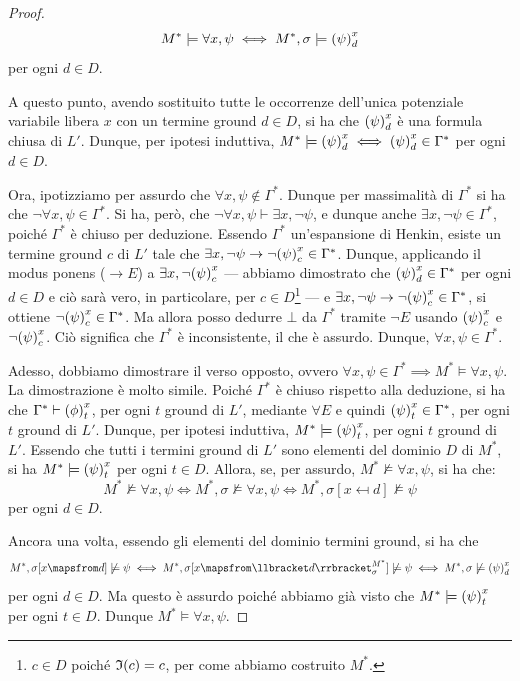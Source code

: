 \begin{proof}
  \[M^* \models \forall x, \psi \iff M^*,\sigma \models {{\left(\psi\right)}^{x}_{d}}\]
  per ogni \(d \in D\).

  A questo punto, avendo sostituito tutte le occorrenze dell'unica potenziale variabile libera \(x\) con un termine ground \(d \in D\), si ha che \({{\left(\psi\right)}^{x}_{d}}\) è una formula chiusa di \(L'\). Dunque, per ipotesi induttiva, \(M^* \models {{\left(\psi\right)}^{x}_{d}} \iff {{\left(\psi\right)}^{x}_{d}} \in \Gamma^*\) per ogni \(d\in D\).

  Ora, ipotizziamo per assurdo che \(\forall x, \psi \notin \Gamma^*\). Dunque per massimalità di \(\Gamma^*\) si ha che \(\neg \forall x, \psi \in \Gamma^*\). Si ha, però, che \(\neg \forall x, \psi\vdash \exists x, \neg \psi\), e dunque anche \(\exists x, \neg \psi \in \Gamma^*\), poiché \(\Gamma^*\) è chiuso per deduzione. Essendo \(\Gamma^*\) un'espansione di Henkin, esiste un termine ground \(c\) di \(L'\) tale che \(\exists x, \neg \psi \to \neg {{\left(\psi\right)}^{x}_{c}} \in \Gamma^*\). Dunque, applicando il modus ponens (\(\to E\)) a \(\exists x, \neg {{\left(\psi\right)}^{x}_{c}}\) --- abbiamo dimostrato che \({{\left(\psi\right)}^{x}_{d}} \in \Gamma^*\) per ogni \(d\in D\) e ciò sarà vero, in particolare, per \(c \in D\)\footnote{\(c \in D\) poiché \(\mathfrak{I}(c)=c\), per come abbiamo costruito \(M^*\).} --- e \(\exists x, \neg \psi \to \neg {{\left(\psi\right)}^{x}_{c}} \in \Gamma^*\), si ottiene \(\neg {{\left(\psi\right)}^{x}_{c}} \in \Gamma^*\). Ma allora posso dedurre \(\bot\) da \(\Gamma^*\) tramite \(\neg E\) usando \({{\left(\psi\right)}^{x}_{c}}\) e \(\neg {{\left(\psi\right)}^{x}_{c}}\). Ciò significa che \(\Gamma^*\) è inconsistente, il che è assurdo. Dunque, \(\forall x, \psi \in \Gamma^*\).

  Adesso, dobbiamo dimostrare il verso opposto, ovvero \(\forall x, \psi \in \Gamma^*\implies M^* \models \forall x, \psi\). La dimostrazione è molto simile.
  Poiché \(\Gamma^*\) è chiuso rispetto alla deduzione, si ha che \(\Gamma^* \vdash {{\left(\phi\right)}^{x}_{t}}\), per ogni \(t\) ground di \(L'\), mediante \(\forall E\) e quindi \({{\left(\psi\right)}^{x}_{t}} \in \Gamma^*\), per ogni \(t\) ground di \(L'\). Dunque, per ipotesi induttiva, \(M^* \models {{\left(\psi\right)}^{x}_{t}}\), per ogni \(t\) ground di \(L'\). Essendo che tutti i termini ground di \(L'\) sono elementi del dominio \(D\) di \(M^*\), si ha \(M^* \models {{\left(\psi\right)}^{x}_{t}}\) per ogni \(t\in D\). Allora, se, per assurdo, \(M^* \not\models \forall x, \psi\), si ha che:
  \[M^* \not\models \forall x, \psi \iff M^* ,\sigma \not\models \forall x, \psi \iff M^*,\sigma[x\mapsfrom d] \not\models \psi\]
  per ogni \(d \in D\).

  Ancora una volta, essendo gli elementi del dominio termini ground, si ha che
  \[M^* ,\sigma[x\mapsfrom d] \not\models \psi \iff M^* ,\sigma[x \mapsfrom \den{d}[M^*][\sigma]] \not\models \psi  \iff M^*,\sigma \not\models \subs{\psi}{x}{d}\]
  per ogni \(d\in D\). Ma questo è assurdo poiché abbiamo già visto che \(M^* \models {{\left(\psi\right)}^{x}_{t}}\) per ogni \(t\in D\). Dunque \(M^* \models \forall x, \psi\).
\end{proof}


